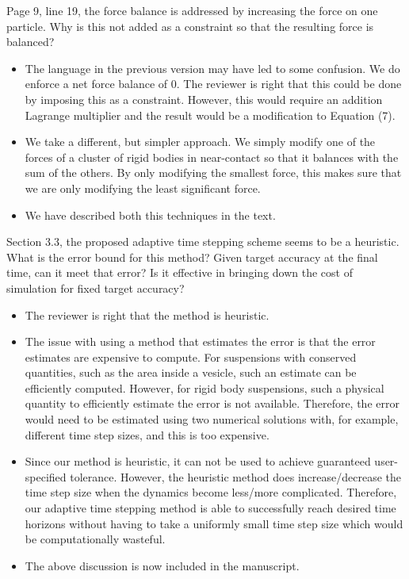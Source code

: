 \documentclass[11pt]{article}
\newcommand{\comment}[1]{{\color{blue} #1}}
\begin{document}
\noindent
\comment{Page 9, line 19, the force balance is addressed by increasing
the force on one particle.  Why is this not added as a constraint so
that the resulting force is balanced?}
\begin{itemize}
  \item The language in the previous version may have led to some
    confusion.  We do enforce a net force balance of 0.  The reviewer is
    right that this could be done by imposing this as a constraint.
    However, this would require an addition Lagrange multiplier and
    the result would be a modification to Equation (7).  
    
  \item We take a different, but simpler approach.  We simply modify one
    of the forces of a cluster of rigid bodies in near-contact so that
    it balances with the sum of the others.  By only modifying the
    smallest force, this makes sure that we are only modifying the least
    significant force.

  \item We have described both this techniques in the text.

\end{itemize}

\noindent
\comment{Section 3.3, the proposed adaptive time stepping scheme seems
  to be a heuristic.  What is the error bound for this method?  Given
  target accuracy at the final time, can it meet that error?  Is it
  effective in bringing down the cost of simulation for fixed target
accuracy?}
\begin{itemize}
  \item The reviewer is right that the method is heuristic.

  \item The issue with using a method that estimates the error is that
    the error estimates are expensive to compute.  For suspensions with
    conserved quantities, such as the area inside a vesicle, such an
    estimate can be efficiently computed.  However, for rigid body
    suspensions, such a physical quantity to efficiently estimate the
    error is not available.  Therefore, the error would need to be
    estimated using two numerical solutions with, for example, different
    time step sizes, and this is too expensive.  

  \item Since our method is heuristic, it can not be used to achieve
    guaranteed user-specified tolerance.  However, the heuristic method
    does increase/decrease the time step size when the dynamics become
    less/more complicated.  Therefore, our adaptive time stepping method
    is able to successfully reach desired time horizons without having
    to take a uniformly small time step size which would be
    computationally wasteful.

  \item The above discussion is now included in the manuscript.

\end{itemize}
\end{document}

